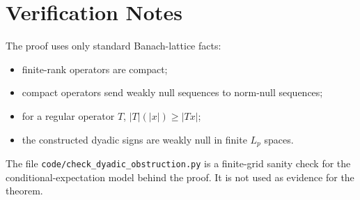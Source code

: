 \documentclass[11pt]{article}
\begin{document}
\section*{Verification Notes}

The proof uses only standard Banach-lattice facts:

\begin{itemize}
\item finite-rank operators are compact;
\item compact operators send weakly null sequences to norm-null sequences;
\item for a regular operator $T$, $|T|(|x|)\ge |Tx|$;
\item the constructed dyadic signs are weakly null in finite $L_p$ spaces.
\end{itemize}

The file \texttt{code/check\_dyadic\_obstruction.py} is a finite-grid
sanity check for the conditional-expectation model behind the proof. It
is not used as evidence for the theorem.
\end{document}
